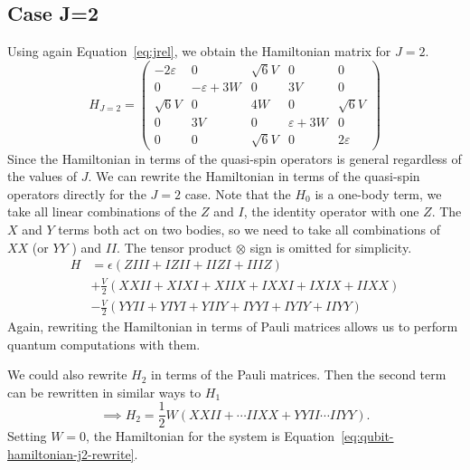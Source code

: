 \subsection{Case J=2}
\label{subsec:case_j2}
Using again Equation~\eqref{eq:jrel}, we obtain the Hamiltonian matrix for $ J=2 $.
\begin{equation}
H_{J = 2} =
\begin{pmatrix}
-2\varepsilon & 0 & \sqrt{6}V & 0 & 0 \\
0 & -\varepsilon + 3W & 0 & 3V & 0 \\
\sqrt{6}V & 0 & 4W & 0 & \sqrt{6}V \\
0 & 3V & 0 & \varepsilon + 3W & 0 \\
0 & 0 & \sqrt{6}V & 0 & 2\varepsilon
\end{pmatrix}
\end{equation}
Since the Hamiltonian in terms of the quasi-spin operators is general regardless of the values of $ J $. We can rewrite the Hamiltonian in terms of the quasi-spin operators directly for the $ J=2 $ case.
Note that the $ H_0 $ is a one-body term, we take all linear combinations of the $ Z $ and $ I $, the identity operator with one $ Z $. The $ X $ and $ Y $ terms both act on two bodies, so we need to take all combinations of $ XX $ (or $ YY $ ) and $ II $. The tensor product $ \otimes $ sign is omitted for simplicity.
\begin{equation}
	\label{eq:qubit-hamiltonian-j2-rewrite}
	\begin{aligned}
		H &= \epsilon\left( ZIII + IZII + IIZI + IIIZ \right) \\
		  &+ \frac{V}{2} (XXII + XIXI + XIIX + IXXI + IXIX + IIXX) \\
		  &- \frac{V}{2} (YYII + YIYI + YIIY + IYYI + IYIY + IIYY)
	\end{aligned}
\end{equation}
Again, rewriting the Hamiltonian in terms of Pauli matrices allows us to perform quantum computations with them.

We could also rewrite $ H_2 $ in terms of the Pauli matrices. Then the second term can be rewritten in similar ways to $ H_1 $ 
\[ \implies H_2 = \frac{1}{2}W(XXII + \cdots IIXX + YYII \cdots IIYY). \]
Setting $ W=0 $, the Hamiltonian for the system is Equation~\eqref{eq:qubit-hamiltonian-j2-rewrite}.


